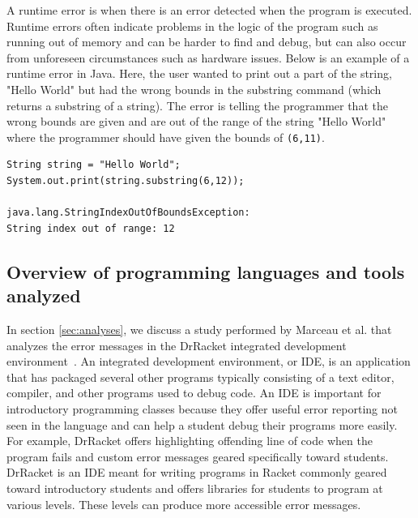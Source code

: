 \documentclass{sig-alternate}
\begin{document}
A runtime error is when there is an error detected when the program is executed.
Runtime errors often indicate problems in the logic of the program such as running out of memory and can be harder to find and debug, but can also occur from unforeseen circumstances such as hardware issues.
Below is an example of a runtime error in Java.
Here, the user wanted to print out a part of the string, "Hello World" but had the wrong bounds in the substring command (which returns a substring of a string).
The error is telling the programmer that the wrong bounds are given and are out of the range of the string "Hello World" where the programmer should have given the bounds of \texttt{(6,11)}.

\begin{verbatim}
String string = "Hello World";
System.out.print(string.substring(6,12));

java.lang.StringIndexOutOfBoundsException:
String index out of range: 12
\end{verbatim}

\subsection{Overview of programming languages and tools analyzed}\label{subsec:languages}

In section \ref{sec:analyses}, we discuss a study performed by Marceau et al. that analyzes the error messages in the DrRacket integrated development environment~\cite{Marceau:2011:MEE:1953163.1953308}.
An integrated development environment, or IDE, is an application that has packaged several other programs typically consisting of a text editor, compiler, and other programs used to debug code.
An IDE is important for introductory programming classes because they offer useful error reporting not seen in the language and can help a student debug their programs more easily.
For example, DrRacket offers highlighting offending line of code when the program fails and custom error messages geared specifically toward students.
DrRacket is an IDE meant for writing programs in Racket commonly geared toward introductory students and offers libraries for students to program at various levels.
These levels can produce more accessible error messages.
\end{document}
